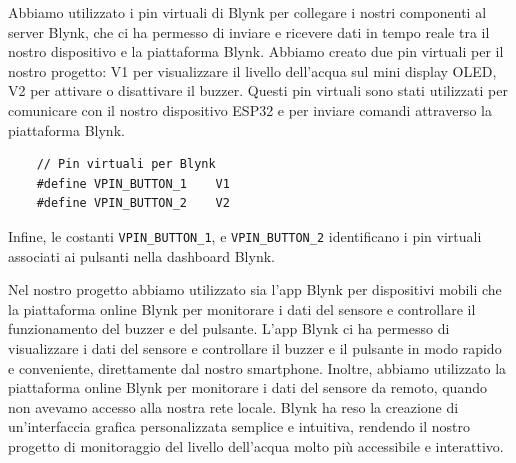 Abbiamo utilizzato i pin virtuali di Blynk per collegare i nostri componenti al server Blynk, che ci ha permesso di inviare e ricevere dati in tempo reale tra il nostro dispositivo e la piattaforma Blynk. Abbiamo creato due pin virtuali per il nostro progetto: V1 per visualizzare il livello dell'acqua sul mini display OLED, V2 per attivare o disattivare il buzzer. Questi pin virtuali sono stati utilizzati per comunicare con il nostro dispositivo ESP32 e per inviare comandi attraverso la piattaforma Blynk. 
\begin{multicols}{2}
    \begin{verbatim}
    // Pin virtuali per Blynk
    #define VPIN_BUTTON_1    V1 
    #define VPIN_BUTTON_2    V2
    \end{verbatim}
    \columnbreak
    Infine, le costanti \texttt{VPIN_BUTTON_1}, e  \texttt{VPIN_BUTTON_2} identificano i pin virtuali associati ai pulsanti nella dashboard Blynk.
\end{multicols}

Nel nostro progetto abbiamo utilizzato sia l'app Blynk per dispositivi mobili che la piattaforma online Blynk per monitorare i dati del sensore e controllare il funzionamento del buzzer e del pulsante. L'app Blynk ci ha permesso di visualizzare i dati del sensore e controllare il buzzer e il pulsante in modo rapido e conveniente, direttamente dal nostro smartphone. Inoltre, abbiamo utilizzato la piattaforma online Blynk per monitorare i dati del sensore da remoto, quando non avevamo accesso alla nostra rete locale. Blynk ha reso la creazione di un'interfaccia grafica personalizzata semplice e intuitiva, rendendo il nostro progetto di monitoraggio del livello dell'acqua molto più accessibile e interattivo.

